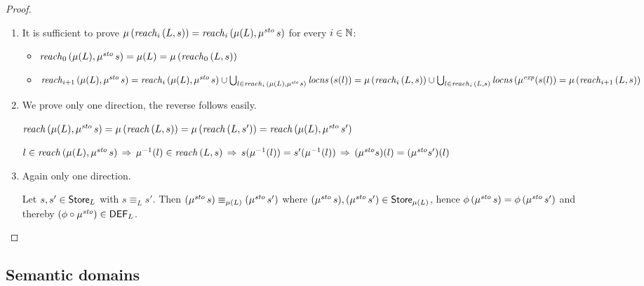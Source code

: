 \documentclass[12pt,a4paper]{report}
\newcommand{\sexp}{\nstyle{exp}}
\newcommand{\ssto}{\nstyle{sto}}
\newcommand{\DEF}{\sstyle{DEF}}
\begin{document}
\begin{proof} \
  \begin{enumerate}
    \item It is sufficient to prove $\mu\,(\reachn{i}{L}{s}) = \reachn{i}{\mu(L)}{\mu^\ssto\,s}$ for every $i\in\mathbb N$:
          \begin{itemize}
            \item $\reachn{0}{\mu(L)}{\mu^\ssto\,s} = \mu(L) = \mu\,(\reachn{0}{L}{s})$

            \item $\reachn{i+1}{\mu(L)}{\mu^\ssto\,s} \\
                  = \reachn{i}{\mu(L)}{\mu^\ssto\,s}
                    \cup \bigcup_{l\in\reachn{i}{\mu(L)}{\mu^\ssto\,s}} \locns{s(l)} \\
                  = \mu\,(\reachn{i}{L}{s})
                    \cup \bigcup_{l\in\reachn{i}{L}{s}} \locns{\mu^\sexp(s(l)} \\
                  = \mu\,(\reachn{i+1}{L}{s})$
          \end{itemize}

    \item We prove only one direction, the reverse follows easily.

          $\reach{\mu(L)}{\mu^\ssto\,s} = \mu\,(\reach{L}{s}) = \mu\,(\reach{L}{s'}) = \reach{\mu(L)}{\mu^\ssto\,s'}$

          $l \in \reach{\mu(L)}{\mu^\ssto\,s} \\
            \,\Rightarrow\,
            \mu^{-1}(l) \in \reach{L}{s} \\
            \,\Rightarrow\,
            s(\mu^{-1}(l)) = s'(\mu^{-1}(l)) \\
            \,\Rightarrow\,
            (\mu^\ssto s)(l) = (\mu^\ssto s')(l)$

    \item Again only one direction.

          Let $s,s'\in\mathsf{Store}_L$ with $s \equiv_L s'$. Then $(\mu^\ssto\,s) \equiv_{\mu(L)} (\mu^\ssto\,s')$
          where $(\mu^\ssto\,s),(\mu^\ssto\,s')\in\Store_{\mu(L)}$, hence $\phi\,(\mu^\ssto\,s)=\phi\,(\mu^\ssto\,s')$
          and thereby $(\phi \circ \mu^\ssto) \in \DEF_L$.
  \end{enumerate}
\end{proof}



\subsection{Semantic domains}
\end{document}
